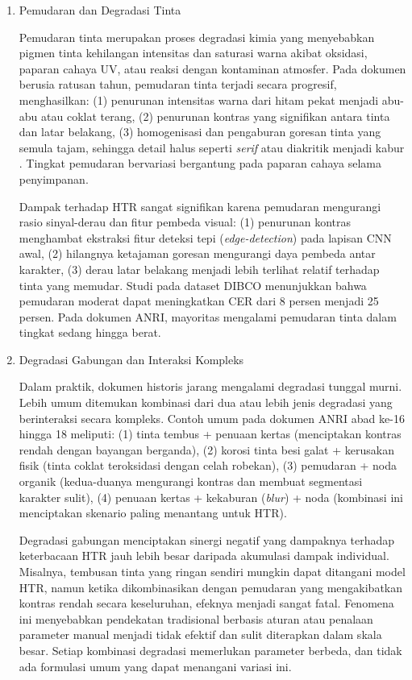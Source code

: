 \documentclass[12pt,a4paper]{article}
\begin{document}
\begin{enumerate}[leftmargin=*, labelindent=0pt, itemsep=1ex, topsep=0pt]
\item Pemudaran dan Degradasi Tinta
\label{para:pemudaran-tinta}

Pemudaran tinta merupakan proses degradasi kimia yang menyebabkan pigmen tinta kehilangan intensitas dan saturasi warna akibat oksidasi, paparan cahaya UV, atau reaksi dengan kontaminan atmosfer. Pada dokumen berusia ratusan tahun, pemudaran tinta terjadi secara progresif, menghasilkan: (1) penurunan intensitas warna dari hitam pekat menjadi abu-abu atau coklat terang, (2) penurunan kontras yang signifikan antara tinta dan latar belakang, (3) homogenisasi dan pengaburan goresan tinta yang semula tajam, sehingga detail halus seperti \textit{serif} atau diakritik menjadi kabur \parencite{pratikakis2013}. Tingkat pemudaran bervariasi bergantung pada paparan cahaya selama penyimpanan.

Dampak terhadap HTR sangat signifikan karena pemudaran mengurangi rasio sinyal-derau dan fitur pembeda visual: (1) penurunan kontras menghambat ekstraksi fitur deteksi tepi (\textit{edge-detection}) pada lapisan CNN awal, (2) hilangnya ketajaman goresan mengurangi daya pembeda antar karakter, (3) derau latar belakang menjadi lebih terlihat relatif terhadap tinta yang memudar. Studi \parencite{pratikakis2013} pada dataset DIBCO menunjukkan bahwa pemudaran moderat dapat meningkatkan CER dari 8 persen menjadi 25 persen. Pada dokumen ANRI, mayoritas mengalami pemudaran tinta dalam tingkat sedang hingga berat.

\item Degradasi Gabungan dan Interaksi Kompleks
\label{para:degradasi-gabungan}

Dalam praktik, dokumen historis jarang mengalami degradasi tunggal murni. Lebih umum ditemukan kombinasi dari dua atau lebih jenis degradasi yang berinteraksi secara kompleks. Contoh umum pada dokumen ANRI abad ke-16 hingga 18 meliputi: (1) tinta tembus + penuaan kertas (menciptakan kontras rendah dengan bayangan berganda), (2) korosi tinta besi galat + kerusakan fisik (tinta coklat teroksidasi dengan celah robekan), (3) pemudaran + noda organik (kedua-duanya mengurangi kontras dan membuat segmentasi karakter sulit), (4) penuaan kertas + kekaburan (\textit{blur}) + noda (kombinasi ini menciptakan skenario paling menantang untuk HTR).

Degradasi gabungan menciptakan sinergi negatif yang dampaknya terhadap keterbacaan HTR jauh lebih besar daripada akumulasi dampak individual. Misalnya, tembusan tinta yang ringan sendiri mungkin dapat ditangani model HTR, namun ketika dikombinasikan dengan pemudaran yang mengakibatkan kontras rendah secara keseluruhan, efeknya menjadi sangat fatal. Fenomena ini menyebabkan pendekatan tradisional berbasis aturan atau penalaan parameter manual menjadi tidak efektif dan sulit diterapkan dalam skala besar. Setiap kombinasi degradasi memerlukan parameter berbeda, dan tidak ada formulasi umum yang dapat menangani variasi ini.


\end{enumerate}
\end{document}

